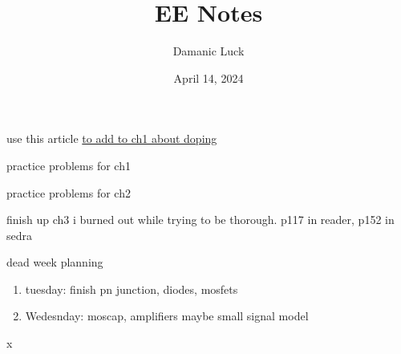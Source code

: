 \documentclass[10pt, openany]{book}
\title{EE Notes}
\author{Damanic Luck}
\date{April 14, 2024}
\begin{document}


\tableofcontents
\begin{todo}
    \item use this article \href{http://home.iitj.ac.in/~sptiwari/EE314/Lecture2_Semi_Basics_Junction.pdf}{to add to ch1 about doping}
    \item practice problems for ch1
    \item practice problems for ch2
    \item finish up ch3 i burned out while trying to be thorough. p117 in reader, p152 in sedra
    \item dead week planning
    \begin{enumerate}
        \item tuesday: finish pn junction, diodes, mosfets
        \item Wedesnday: moscap, amplifiers maybe small signal model
    \end{enumerate}x
\end{todo}

\newpage


\newpage


\newpage

\end{document}
